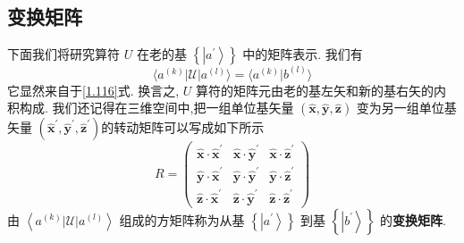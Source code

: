 	\subsection{变换矩阵}
	下面我们将研究算符 $U$ 在老的基 $\left\{ \left| {a}^{\prime }\right\rangle \right\}$ 中的矩阵表示. 我们有
	\begin{equation}
		\langle {{a}^{\left( k\right) }\left| \mathcal{U}\right| {a}^{\left( l\right) }}\rangle = \langle {{a}^{\left( k\right) } | {b}^{\left( l\right) }}\rangle
	\end{equation}
	它显然来自于\ref{1.116}式. 换言之, $U$ 算符的矩阵元由老的基左矢和新的基右矢的内积构成. 我们还记得在三维空间中,把一组单位基矢量 $\left( {\widehat{\mathbf{x}},\widehat{\mathbf{y}},\widehat{\mathbf{z}}}\right)$ 变为另一组单位基矢量 $\left( {{\widehat{\mathbf{x}}}^{\prime },{\widehat{\mathbf{y}}}^{\prime },{\widehat{\mathbf{z}}}^{\prime }}\right)$的转动矩阵可以写成如下所示
	\begin{equation}
		R = \left( \begin{array}{lll} \widehat{\mathbf{x}} \cdot {\widehat{\mathbf{x}}}^{\prime } & \widehat{\mathbf{x}} \cdot {\widehat{\mathbf{y}}}^{\prime } & \widehat{\mathbf{x}} \cdot {\widehat{\mathbf{z}}}^{\prime } \\ \widehat{\mathbf{y}} \cdot {\widehat{\mathbf{x}}}^{\prime } & \widehat{\mathbf{y}} \cdot {\widehat{\mathbf{y}}}^{\prime } & \widehat{\mathbf{y}} \cdot {\widehat{\mathbf{z}}}^{\prime } \\ \widehat{\mathbf{z}} \cdot {\widehat{\mathbf{x}}}^{\prime } & \widehat{\mathbf{z}} \cdot {\widehat{\mathbf{y}}}^{\prime } & \widehat{\mathbf{z}} \cdot {\widehat{\mathbf{z}}}^{\prime } \end{array}\right)
	\end{equation}
	由 $\left\langle {{a}^{\left( k\right) }\left| \mathcal{U}\right| {a}^{\left( l\right) }}\right\rangle$ 组成的方矩阵称为从基 $\left\{ \left| {a}^{\prime }\right\rangle \right\}$ 到基 $\left\{ \left| {b}^{\prime }\right\rangle \right\}$ 的\textbf{变换矩阵}.
	
